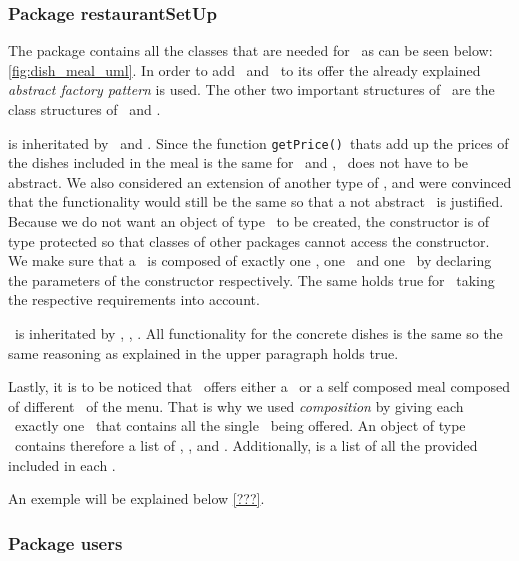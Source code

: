 
\subsubsection{Package restaurantSetUp} %
\label{ssub:restaurantsetup}

The package \restaurantSetup contains all the classes that are needed for \Restaurant~as can be seen below:  \ref{fig:dish_meal_uml}.
In order to add \Dish~and \Meal~to its offer the already explained \emph{abstract factory pattern} is used. The other two important structures of \restaurantSetup~are the class structures of \Meal~and \Dish. 

\Meal is inheritated by \HalfMeal~and \FullMeal. Since the function \lstinline|getPrice()|~thats add up the prices of the dishes included in the meal is the same for \FullMeal~and \HalfMeal, \Meal~does not have to be abstract. We also considered an extension of another type of \Meal, and were convinced that the functionality would still be the same so that a not abstract \Meal~is justified.
Because we do not want an object of type \Meal~to be created, the constructor is of type protected so that classes of other packages cannot access the constructor. We make sure that a \FullMeal~is composed of exactly one \Starter, one \MainDish~and one \Dessert~by declaring the parameters of the constructor respectively. The same holds true for \HalfMeal~taking the respective requirements into account.

\Dish~is inheritated by \Starter, \MainDish, \Dessert. All functionality for the concrete dishes is the same so the same reasoning as explained in the upper paragraph holds true. 

Lastly, it is to be noticed that \Restaurant~offers either a \Meal~or a self composed meal composed of different \Dish~of the menu. 
That is why we used \emph{composition} by giving each \Restaurant~exactly one \Menu~that contains all the single \Dish~being offered.
An object of type \Menu~contains therefore a list of \Starter, \MainDish, and \Dessert. Additionally, is a list of all the provided \Meal included in each \Restaurant.

An exemple will be explained below \ref{???}.


\subsubsection{Package users} %
\label{ssub:users}

